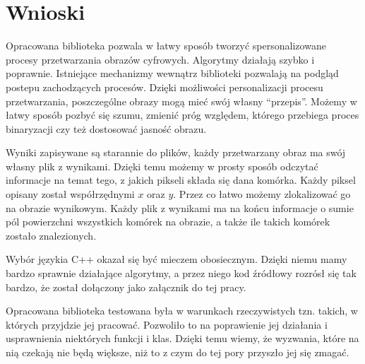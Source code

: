 \documentclass{article}
\begin{document}
    \section{Wnioski}
    {
        \Large
        \justifying
        \quad
        Opracowana biblioteka pozwala w łatwy sposób tworzyć spersonalizowane procesy przetwarzania obrazów cyfrowych.
        Algorytmy działają szybko i poprawnie.
        Istniejące mechanizmy wewnątrz biblioteki pozwalają na podgląd postepu zachodzących procesów.
        Dzięki możliwości personalizacji procesu przetwarzania, poszczególne obrazy mogą mieć swój własny ``przepis''.
        Możemy w łatwy sposób pozbyć się szumu, zmienić próg względem, którego przebiega proces binaryzacji czy też dostosować jasność obrazu.
    }

    \vspace{0.5cm}

    {
        \Large
        \justifying
        \quad
        Wyniki zapisywane są starannie do plików, każdy przetwarzany obraz ma swój własny plik z wynikami.
        Dzięki temu możemy w prosty sposób odczytać informacje na temat tego, z jakich pikseli składa się dana komórka.
        Każdy piksel opisany został współrzędnymi $x$ oraz $y$.
        Przez co łatwo możemy zlokalizować go na obrazie wynikowym.
        Każdy plik z wynikami ma na końcu informacje o sumie pól powierzchni wszystkich komórek na obrazie, a także ile takich komórek zostało znalezionych.
    }

    \vspace{0.5cm}

    {
        \Large
        \justifying
        \quad
        Wybór językia C++ okazał się być mieczem obosiecznym.
        Dzięki niemu mamy bardzo sprawnie działające algorytmy, a przez niego kod źródłowy rozrósł się tak bardzo, że został dołączony jako załącznik do tej pracy.
    }

    \vspace{0.5cm}

    {
        \Large
        \justifying
        \quad
        Opracowana biblioteka testowana była w warunkach rzeczywistych tzn. takich, w których przyjdzie jej pracować.
        Pozwoliło to na poprawienie jej działania i usprawnienia niektórych funkcji i klas.
        Dzięki temu wiemy, że wyzwania, które na nią czekają nie będą większe, niż to z czym do tej pory przyszło jej się zmagać.
    }

    \vspace{0.5cm}
\end{document}
